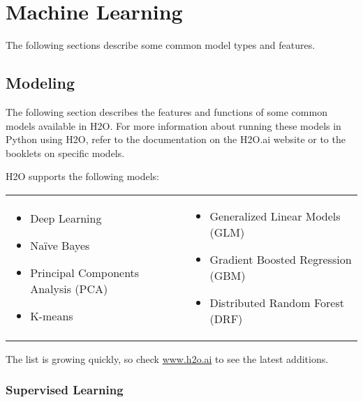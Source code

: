 {\section{Machine Learning}

The following sections describe some common model types and features. 


\subsection{Modeling}
The following section describes the features and functions of some common models available in H2O.  For more information about running these models in Python using H2O, refer to the documentation on
the H2O.ai website or to the booklets on specific models.


H2O supports the following models:  


\begin{frame}%

\begin{tabular}{p{5.5cm}p{5.5cm}}

\begin{itemize}
  \item Deep Learning
  \item Na\"{i}ve Bayes
  \item Principal Components Analysis (PCA)
  \item K-means
\end{itemize} &

\begin{itemize}
  \item Generalized Linear Models (GLM) 
  \item Gradient Boosted Regression (GBM)
  \item Distributed Random Forest (DRF)
\end{itemize}

\end{tabular}

\end{frame}


The list is growing quickly, so check \url{www.h2o.ai} to see the latest additions. 

\subsubsection{Supervised Learning}


}

